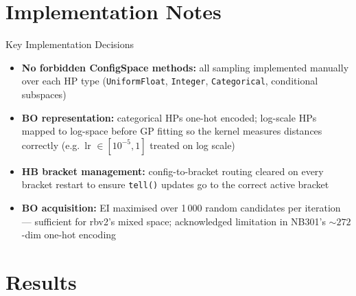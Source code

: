 \documentclass[t,english]{beamer}
\begin{document}
\section{Implementation Notes}

\begin{frame}{Key Implementation Decisions}
  \begin{itemize}[<+->]
    \item \textbf{No forbidden ConfigSpace methods:}
          all sampling implemented manually over each HP type
          (\texttt{UniformFloat}, \texttt{Integer}, \texttt{Categorical},
          conditional subspaces)

    \item \textbf{BO representation:}
          categorical HPs one-hot encoded; log-scale HPs mapped to
          log-space before GP fitting so the kernel measures distances
          correctly (e.g.\ lr $\in [10^{-5},1]$ treated on log scale)

    \item \textbf{HB bracket management:}
          config-to-bracket routing cleared on every bracket restart
          to ensure \texttt{tell()} updates go to the correct active bracket

    \item \textbf{BO acquisition:}
          EI maximised over 1\,000 random candidates per iteration —
          sufficient for rbv2's mixed space; acknowledged limitation
          in NB301's ${\sim}272$-dim one-hot encoding
  \end{itemize}
\end{frame}

\section{Results}
\end{document}
